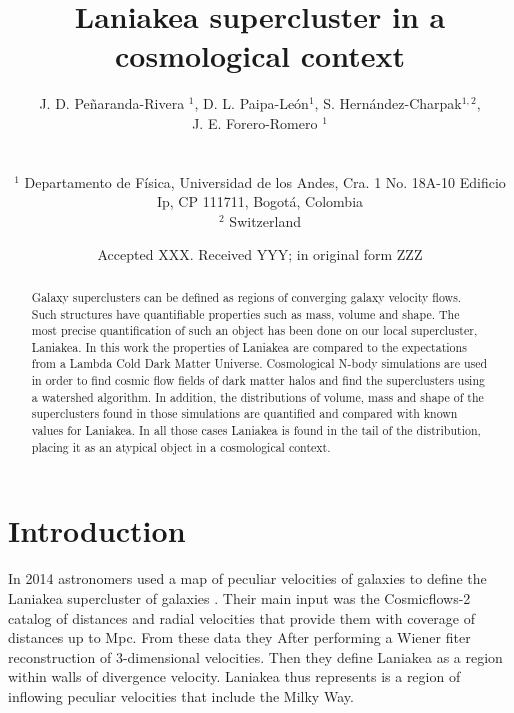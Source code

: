\documentclass[usenatbib]{mnras}
\title[Laniakea in context]{Laniakea supercluster in a cosmological context}
\author[Pe\~naranda-Rivera et al.]{
\parbox[t]{\textwidth}{
    {J. D. Pe\~naranda-Rivera $^1$,} 
    {D. L.  Paipa-Le\'on$^{1}$,}
    {S. Hern\'andez-Charpak$^{1,2}$,}\\
    {J. E. Forero-Romero $^{1}$}
}
\\\\
$^{1}$ Departamento de F\'isica, Universidad de los Andes, Cra. 1
  No. 18A-10 Edificio Ip, CP 111711, Bogot\'a, Colombia \\
$^{2}$ Switzerland\\
}
\date{Accepted XXX. Received YYY; in original form ZZZ}
\begin{document}
\label{firstpage}
\pagerange{\pageref{firstpage}--\pageref{lastpage}}
\maketitle

\maketitle
\begin{abstract}
Galaxy superclusters can be defined as regions of converging galaxy
velocity flows. 
Such structures have quantifiable properties such as mass, volume and
shape. 
The most precise quantification of such an object has been done on our local supercluster, Laniakea. 
In this work the properties of Laniakea are compared to the
expectations from a Lambda Cold Dark Matter Universe. 
Cosmological N-body simulations are used in order to find cosmic flow
fields of dark matter halos and find the superclusters using a
watershed algorithm. 
In addition, the distributions of volume, mass and shape of the
superclusters found in those simulations are quantified and compared
with known values for Laniakea. 
In all those cases Laniakea is found in the tail of the distribution,
placing it as an atypical object in a cosmological context.  
\end{abstract}

\begin{keywords}
\end{keywords}




\section{Introduction}

In 2014 astronomers used a map  of peculiar velocities of galaxies to
define the Laniakea supercluster of galaxies
\citep{2014Natur.513...71T}.  
Their main input was the Cosmicflows-2 catalog of distances and radial
velocities that provide them with coverage of distances up to Mpc. 
From these data they After performing a Wiener fiter reconstruction of
3-dimensional velocities.
Then they define Laniakea as  a region within walls of divergence velocity.  
Laniakea thus represents is a region of inflowing peculiar velocities
that include the Milky Way. 
\end{document}
